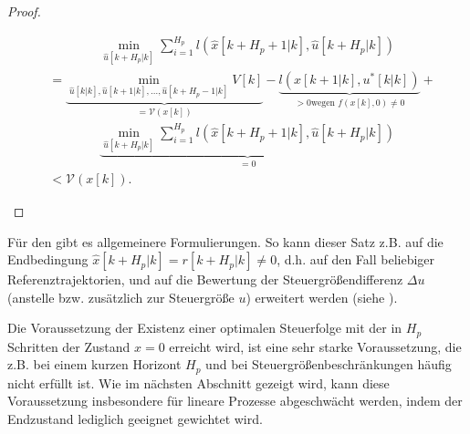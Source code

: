 \begin{proof}
\begin{enumerate}
\begin{align*}
  	& \qquad \qquad \min\limits_{\hat{u}[k+H_p|k]}\sum\limits_{i=1}^{H_p}l\left( \hat{x}[k+H_p+1|k],\hat{u}[k+H_p|k] \right)\\
  	& = \underbrace{ \min\limits_{\hat{u}[k|k],\hat{u}[k+1|k],\ldots,\hat{u}[k+H_p-1|k]}V[k] }_{=\mathcal{V}(x[k])}-\underbrace{ l\left( \hat{x}[k+1|k],u^{\ast}[k|k] \right) }_{>0\text{
  	wegen }f(x[k],0)\neq 0}+\\
  	& \qquad\qquad \underbrace{ \min\limits_{\hat{u}[k+H_p|k]}\sum\limits_{i=1}^{H_p}l\left( \hat{x}[k+H_p+1|k],\hat{u}[k+H_p|k] \right) }_{=0}\\
  	& < \mathcal{V}(x[k]).
  \end{align*}
\end{enumerate}
\end{proof}
\begin{remark}
Für den  gibt es allgemeinere Formulierungen. So kann dieser Satz z.B. auf die Endbedingung
$\hat{x}[k+H_p|k]=r[k+H_p|k]\neq 0$, d.h. auf den Fall beliebiger Referenztrajektorien, und auf die Bewertung der Steuergrößendifferenz $\Delta u$
(anstelle bzw. zusätzlich zur Steuergröße $u$) erweitert werden (siehe \cite{Maciejowski2002}).
\end{remark}
Die Voraussetzung der Existenz einer optimalen Steuerfolge mit der in $H_p$ Schritten der Zustand $x=0$ erreicht wird, ist eine sehr starke Voraussetzung, die z.B. bei einem kurzen
Horizont $H_p$ und bei Steuergrößenbeschränkungen häufig nicht erfüllt ist. Wie im nächsten Abschnitt gezeigt wird, kann diese Voraussetzung insbesondere für lineare Prozesse
abgeschwächt werden, indem der Endzustand lediglich geeignet gewichtet wird.

